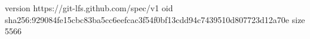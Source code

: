 version https://git-lfs.github.com/spec/v1
oid sha256:929084fe15cbc83ba5cc6eefcac3f54f0bf13cdd94c7439510d807723d12a70e
size 5566
